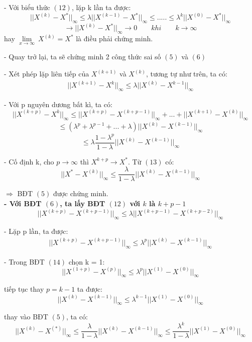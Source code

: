 \documentclass[12pt,a4paper]{article}
\begin{document}
\begin{itemize}
- Với biểu thức $(12)$, lặp k lần ta được: 
$$ ||X^{(k)} - X^{*}||_{\infty} \leqslant \lambda ||X^{(k - 1)} - X^{*}||_{\infty} \leqslant ..... \leqslant {\lambda}^k ||X^{(0)} - X^{*}||_{\infty}$$
$$ \longrightarrow ||X^{(k)} - X^{*}||_{\infty} \rightarrow 0 \qquad khi \qquad k \rightarrow \infty $$ 
hay $ \mathop {\lim }\limits_{x \to \infty } \ X^{(k)} = X^* $ là điều phải chứng minh.

- Quay trở lại, ta sẽ chứng minh 2 công thức sai số $(5)$ và $(6)$ 

- Xét phép lặp liên tiếp của $X^{(k + 1)}$ và $X^{(k)}$, tương tự như trên, ta có:
\begin{align}
||X^{(k + 1)} - X^{k}||_{\infty} \leqslant \lambda ||X^{(k)} - X^{k - 1}||_{\infty}
\end{align}

- Với p nguyên dương bất kì, ta có:
$$||X^{(k + p)} - X^{k}||_{\infty} \leqslant ||X^{(k + p)} - X^{(k + p - 1)}||_{\infty} + ... + ||X^{(k + 1)} - X^{(k)}||_{\infty} $$
\begin{align}
\leqslant ({\lambda}^p + {\lambda}^{p - 1} + ... + \lambda)||X^{(k)} - X^{(k - 1)}||_{\infty}  
\end{align}
$$ \leqslant \lambda \frac{1 - {\lambda}^p}{1- \lambda} ||X^{(k)} - X^{(k - 1)}||_{\infty}$$

- Cố định k, cho $p \rightarrow \infty$ thì $X^{k + p} \rightarrow X^*$. Từ $(13)$ có:
$$ ||X^{*} - X^{(k)}||_{\infty} \leqslant \frac{\lambda}{1 - \lambda} ||X^{(k)} - X^{(k - 1)}||_{\infty}$$

$\Longrightarrow$ BĐT $(5)$ được chứng minh.\\

\textbf{- Với BĐT $(6)$, ta lấy BĐT $(12)$ với $k$ là $k + p - 1$ }
$$ ||X^{(k + p)} - X^{(k + p - 1)}||_{\infty} \leqslant \lambda ||X^{(k + p - 1)} - X^{(k + p - 2)}||_{\infty}$$

- Lặp p lần, ta được:
\begin{align}
||X^{(k + p)} - X^{(k + p - 1)}||_{\infty} \leqslant {\lambda}^p ||X^{(k)} - X^{(k - 1)}||_{\infty}
\end{align}

- Trong BĐT $(14)$ chọn k = 1:
$$ ||X^{(1 + p)} - X^{(p)}||_{\infty} \leqslant {\lambda}^p ||X^{(1)} - X^{(0)}||_{\infty} $$

tiếp tục thay $p = k - 1$ ta được: 
$$ ||X^{(k)} - X^{(k - 1)}||_{\infty} \leqslant {\lambda}^{k - 1} ||X^{(1)} - X^{(0)}||_{\infty} $$

thay vào BĐT $(5)$, ta có:
$$ ||X^{(k)} - X^{(*)}||_{\infty} \leqslant \frac{\lambda}{1 - \lambda} ||X^{(k)} - X^{(k - 1)}||_{\infty} \leqslant \frac{{\lambda}^k}{1 - \lambda} ||X^{(1)} - X^{(0)}||_{\infty} $$


\end{itemize}
\end{document}
